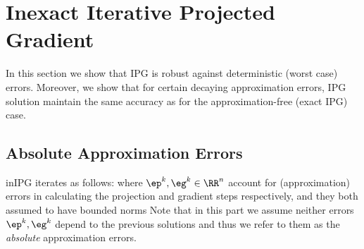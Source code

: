 {}








\section{Inexact Iterative Projected Gradient}
In this section we show that IPG is robust against deterministic (worst case) errors. Moreover, we show that for certain decaying approximation errors, IPG solution maintain  the same accuracy as for the approximation-free (exact IPG) case.
\subsection{Absolute Approximation Errors}
inIPG iterates as follows:
where $\ep^k,\eg^k\in \RR^n$ account for (approximation) errors in calculating the projection and gradient steps respectively, and they both assumed to have bounded norms 
Note that in this part we assume neither errors $\ep^k,\eg^k$ depend to the previous solutions and thus we refer to them as the \emph{absolute} approximation errors.  


